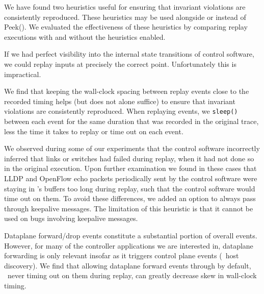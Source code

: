 We have found two heuristics useful for ensuring that invariant violations are consistently reproduced.
These heuristics may be used alongside or instead of {\sc Peek()}. We evaluated the effectiveness
of these heuristics by comparing replay executions with and
without the heuristics enabled.

 If we had perfect visibility into
the internal state transitions of control software, we could replay inputs at precisely the correct point.
Unfortunately this is impractical.

We find that keeping the wall-clock spacing between replay events
close to the recorded timing helps (but does not alone suffice) to
ensure that invariant violations are consistently
reproduced. When replaying events, we \verb=sleep()= between each
event for the same duration that was recorded in the original trace,
less the time it takes to replay or time out on each event.

 We observed during some
of our experiments that the control software incorrectly inferred that links or switches had
failed during replay, when it had not done so in the original execution.
Upon further examination we found in these cases that LLDP and OpenFlow echo
packets periodically sent by the control software were
staying in \projectname's buffers too long during replay, such that the
control software would time out on them. To avoid these differences,
we added an option to always pass through
keepalive messages. The limitation of this
heuristic is that it cannot be used on bugs involving keepalive messages.


 Dataplane forward/drop events constitute a
substantial portion of overall events. However, for
many of the controller applications we are interested in, dataplane
forwarding is only relevant insofar as it triggers control plane events
(\eg~host discovery). We find that allowing dataplane forward events through by
default, \ie~never timing out on them during replay, can greatly decrease
skew in wall-clock timing.

